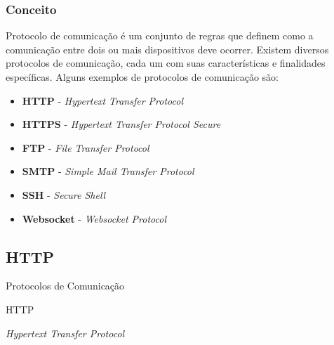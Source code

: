 \documentclass[
	10pt, %
	t, %
]{beamer}
\begin{document}
\begin{frame}
	\frametitle{Conceito}

	Protocolo de comunicação é um conjunto de regras que definem como a comunicação entre dois ou mais dispositivos deve ocorrer. Existem diversos protocolos de comunicação, cada um com suas características e finalidades específicas. Alguns exemplos de protocolos de comunicação são:

	\begin{itemize}
		\item \textbf{HTTP} - \textit{Hypertext Transfer Protocol}
		\item \textbf{HTTPS} - \textit{Hypertext Transfer Protocol Secure}
		\item \textbf{FTP} - \textit{File Transfer Protocol}
		\item \textbf{SMTP} - \textit{Simple Mail Transfer Protocol}
		\item \textbf{SSH} - \textit{Secure Shell}
		\item \textbf{Websocket} - \textit{Websocket Protocol}
	\end{itemize}

\end{frame}


\subsection{HTTP}

\begin{frame}
	\begin{center}
		
		\bigskip\bigskip\bigskip\bigskip %
		{\Large Protocolos de Comunicação}
		
		\bigskip\bigskip %
		{\Huge HTTP}
		
		\smallskip
		{\small \textit{Hypertext Transfer Protocol}}
	\end{center}

\end{frame}
\end{document}
